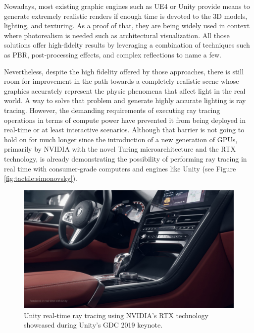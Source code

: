 Nowadays, most existing graphic engines such as \ac{UE4} or Unity provide means to generate extremely realistic renders if enough time is devoted to the \ac{3D} models, lighting, and texturing. As a proof of that, they are being widely used in context where photorealism is needed such as architectural visualization. All those solutions offer high-fidelty results by leveraging a combination of techniques such as \ac{PBR}, post-processing effects, and complex reflections to name a few.

Nevertheless, despite the high fidelity offered by those approaches, there is still room for improvement in the path towards a completely realistic scene whose graphics accurately represent the physic phenomena that affect light in the real world. A way to solve that problem and generate highly accurate lighting is ray tracing. However, the demanding requirements of executing ray tracing operations in terms of compute power have prevented it from being deployed in real-time or at least interactive scenarios. Although that barrier is not going to hold on for much longer since the introduction of a new generation of \acp{GPU}, primarily by NVIDIA with the novel Turing microarchitecture and the RTX technology, is already demonstrating the possibility of performing ray tracing in real time with consumer-grade computers and engines like Unity (see Figure \ref{fig:tactile:simonovsky}). 

\begin{figure}[!htb]
    \centering
    \includegraphics[width=\linewidth, clip, trim=0 275 0 0]{Figures/Sim2Real/unityrt.jpg}
    \caption{Unity real-time ray tracing using NVIDIA's RTX technology showcased during Unity's GDC 2019 keynote.}
    \label{fig:sim2real:unityrt}
\end{figure}

\clearpage

